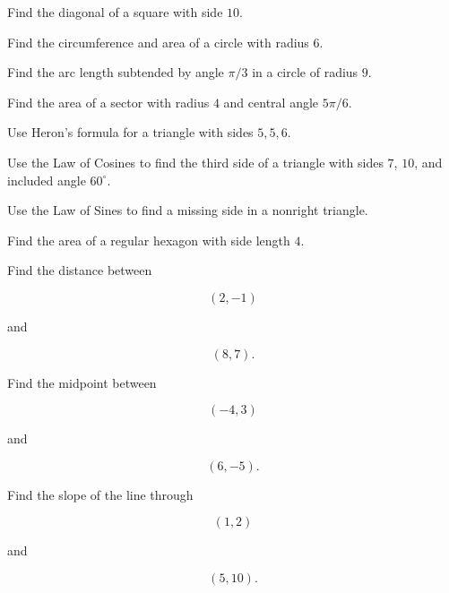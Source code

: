 \begin{exercise}[1]
Find the diagonal of a square with side \(10\).
\end{exercise}

\begin{exercise}[1]
Find the circumference and area of a circle with radius \(6\).
\end{exercise}

\begin{exercise}[2]
Find the arc length subtended by angle \(\pi/3\) in a circle of radius \(9\).
\end{exercise}

\begin{exercise}[2]
Find the area of a sector with radius \(4\) and central angle \(5\pi/6\).
\end{exercise}

\begin{exercise}[2]
Use Heron's formula for a triangle with sides \(5,5,6\).
\end{exercise}

\begin{exercise}[2]
Use the Law of Cosines to find the third side of a triangle with sides
\(7\), \(10\), and included angle \(60^\circ\).
\end{exercise}

\begin{exercise}[2]
Use the Law of Sines to find a missing side in a nonright triangle.
\end{exercise}

\begin{exercise}[2]
Find the area of a regular hexagon with side length \(4\).
\end{exercise}

\begin{exercise}[2]
Find the distance between

\[
(2,-1)
\]

and

\[
(8,7).
\]
\end{exercise}

\begin{exercise}[2]
Find the midpoint between

\[
(-4,3)
\]

and

\[
(6,-5).
\]
\end{exercise}

\begin{exercise}[2]
Find the slope of the line through

\[
(1,2)
\]

and

\[
(5,10).
\]
\end{exercise}

